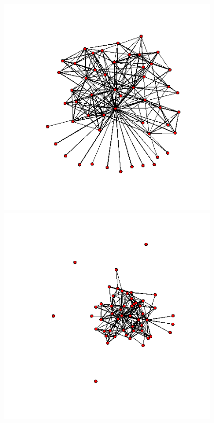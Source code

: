 \documentclass[a4paper, 11pt]{report}
\theoremstyle{definition}
\begin{document}
\begin{figure}[h]
    \begin{center}
    \includegraphics[scale=0.26]{pictures/m3_19_nework.png}
    \includegraphics[scale=0.26]{pictures/w3_19_nework.png}

\end{center}
\end{figure}
\end{document}
